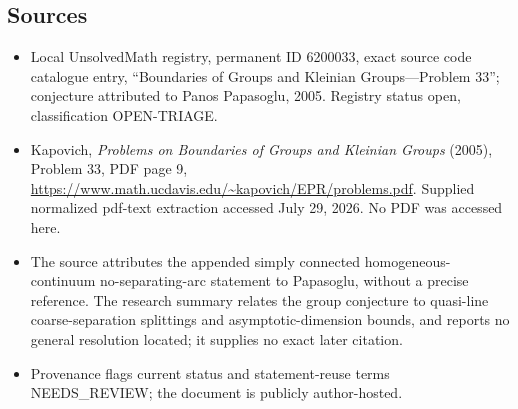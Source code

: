 \documentclass[11pt]{article}
\begin{document}
\subsection{Sources}
\begin{itemize}
\item Local UnsolvedMath registry, permanent ID 6200033, exact source code catalogue entry, ``Boundaries of Groups and Kleinian Groups---Problem 33''; conjecture attributed to Panos Papasoglu, 2005. Registry status open, classification OPEN-TRIAGE.
\item Kapovich, \emph{Problems on Boundaries of Groups and Kleinian Groups} (2005), Problem 33, PDF page 9, \url{https://www.math.ucdavis.edu/~kapovich/EPR/problems.pdf}. Supplied normalized pdf-text extraction accessed July 29, 2026. No PDF was accessed here.
\item The source attributes the appended simply connected homogeneous-continuum no-separating-arc statement to Papasoglu, without a precise reference. The research summary relates the group conjecture to quasi-line coarse-separation splittings and asymptotic-dimension bounds, and reports no general resolution located; it supplies no exact later citation.
\item Provenance flags current status and statement-reuse terms NEEDS\_REVIEW; the document is publicly author-hosted.
\end{itemize}
\end{document}
